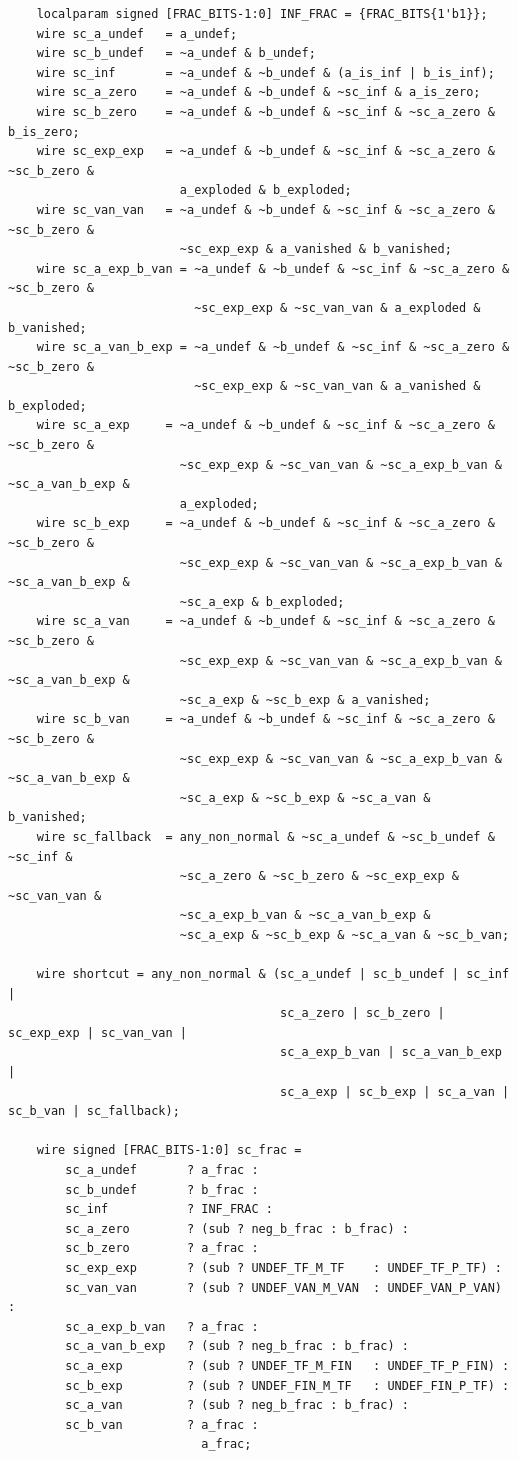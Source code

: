 \documentclass[12pt,letter]{article}
\begin{document}
\begin{lstlisting}
    localparam signed [FRAC_BITS-1:0] INF_FRAC = {FRAC_BITS{1'b1}};
    wire sc_a_undef   = a_undef;
    wire sc_b_undef   = ~a_undef & b_undef;
    wire sc_inf       = ~a_undef & ~b_undef & (a_is_inf | b_is_inf);
    wire sc_a_zero    = ~a_undef & ~b_undef & ~sc_inf & a_is_zero;
    wire sc_b_zero    = ~a_undef & ~b_undef & ~sc_inf & ~sc_a_zero & b_is_zero;
    wire sc_exp_exp   = ~a_undef & ~b_undef & ~sc_inf & ~sc_a_zero & ~sc_b_zero &
                        a_exploded & b_exploded;
    wire sc_van_van   = ~a_undef & ~b_undef & ~sc_inf & ~sc_a_zero & ~sc_b_zero &
                        ~sc_exp_exp & a_vanished & b_vanished;
    wire sc_a_exp_b_van = ~a_undef & ~b_undef & ~sc_inf & ~sc_a_zero & ~sc_b_zero &
                          ~sc_exp_exp & ~sc_van_van & a_exploded & b_vanished;
    wire sc_a_van_b_exp = ~a_undef & ~b_undef & ~sc_inf & ~sc_a_zero & ~sc_b_zero &
                          ~sc_exp_exp & ~sc_van_van & a_vanished & b_exploded;
    wire sc_a_exp     = ~a_undef & ~b_undef & ~sc_inf & ~sc_a_zero & ~sc_b_zero &
                        ~sc_exp_exp & ~sc_van_van & ~sc_a_exp_b_van & ~sc_a_van_b_exp &
                        a_exploded;
    wire sc_b_exp     = ~a_undef & ~b_undef & ~sc_inf & ~sc_a_zero & ~sc_b_zero &
                        ~sc_exp_exp & ~sc_van_van & ~sc_a_exp_b_van & ~sc_a_van_b_exp &
                        ~sc_a_exp & b_exploded;
    wire sc_a_van     = ~a_undef & ~b_undef & ~sc_inf & ~sc_a_zero & ~sc_b_zero &
                        ~sc_exp_exp & ~sc_van_van & ~sc_a_exp_b_van & ~sc_a_van_b_exp &
                        ~sc_a_exp & ~sc_b_exp & a_vanished;
    wire sc_b_van     = ~a_undef & ~b_undef & ~sc_inf & ~sc_a_zero & ~sc_b_zero &
                        ~sc_exp_exp & ~sc_van_van & ~sc_a_exp_b_van & ~sc_a_van_b_exp &
                        ~sc_a_exp & ~sc_b_exp & ~sc_a_van & b_vanished;
    wire sc_fallback  = any_non_normal & ~sc_a_undef & ~sc_b_undef & ~sc_inf &
                        ~sc_a_zero & ~sc_b_zero & ~sc_exp_exp & ~sc_van_van &
                        ~sc_a_exp_b_van & ~sc_a_van_b_exp &
                        ~sc_a_exp & ~sc_b_exp & ~sc_a_van & ~sc_b_van;

    wire shortcut = any_non_normal & (sc_a_undef | sc_b_undef | sc_inf |
                                      sc_a_zero | sc_b_zero | sc_exp_exp | sc_van_van |
                                      sc_a_exp_b_van | sc_a_van_b_exp |
                                      sc_a_exp | sc_b_exp | sc_a_van | sc_b_van | sc_fallback);

    wire signed [FRAC_BITS-1:0] sc_frac =
        sc_a_undef       ? a_frac :
        sc_b_undef       ? b_frac :
        sc_inf           ? INF_FRAC :
        sc_a_zero        ? (sub ? neg_b_frac : b_frac) :
        sc_b_zero        ? a_frac :
        sc_exp_exp       ? (sub ? UNDEF_TF_M_TF    : UNDEF_TF_P_TF) :
        sc_van_van       ? (sub ? UNDEF_VAN_M_VAN  : UNDEF_VAN_P_VAN) :
        sc_a_exp_b_van   ? a_frac :
        sc_a_van_b_exp   ? (sub ? neg_b_frac : b_frac) :
        sc_a_exp         ? (sub ? UNDEF_TF_M_FIN   : UNDEF_TF_P_FIN) :
        sc_b_exp         ? (sub ? UNDEF_FIN_M_TF   : UNDEF_FIN_P_TF) :
        sc_a_van         ? (sub ? neg_b_frac : b_frac) :
        sc_b_van         ? a_frac :
                           a_frac;


\end{lstlisting}
\end{document}
